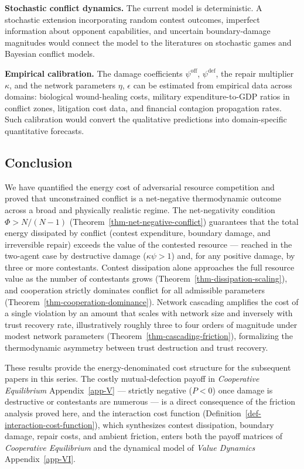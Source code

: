 \documentclass[11pt]{article}
\theoremstyle{plain}
\theoremstyle{definition}
\theoremstyle{remark}
\let\origsubsection\subsection
\renewcommand{\subsection}{\needspace{7\baselineskip}\origsubsection}
\begin{document}
\textbf{Stochastic conflict dynamics.} The current model is
deterministic. A stochastic extension incorporating random contest
outcomes, imperfect information about opponent capabilities, and
uncertain boundary-damage magnitudes would connect the model to the
literatures on stochastic games and Bayesian conflict models.

\textbf{Empirical calibration.} The damage coefficients
\(\psi^{\text{off}}\), \(\psi^{\text{def}}\), the repair multiplier
\(\kappa\), and the network parameters \(\eta\), \(\epsilon\) can be
estimated from empirical data across domains: biological wound-healing
costs, military expenditure-to-GDP ratios in conflict zones, litigation
cost data, and financial contagion propagation rates. Such calibration
would convert the qualitative predictions into domain-specific
quantitative forecasts.

\subsection{Conclusion}\label{conclusion-3}

We have quantified the energy cost of adversarial resource competition
and proved that unconstrained conflict is a net-negative thermodynamic
outcome across a broad and physically realistic regime. The
net-negativity condition \(\Phi > N/(N-1)\)
(Theorem~\ref{thm-net-negative-conflict}) guarantees that the total
energy dissipated by conflict (contest expenditure, boundary damage, and
irreversible repair) exceeds the value of the contested resource ---
reached in the two-agent case by destructive damage (\(\kappa\psi > 1\))
and, for any positive damage, by three or more contestants. Contest
dissipation alone approaches the full resource value as the number of
contestants grows (Theorem~\ref{thm-dissipation-scaling}), and
cooperation strictly dominates conflict for all admissible parameters
(Theorem~\ref{thm-cooperation-dominance}). Network cascading amplifies
the cost of a single violation by an amount that scales with network
size and inversely with trust recovery rate, illustratively roughly
three to four orders of magnitude under modest network parameters
(Theorem~\ref{thm-cascading-friction}), formalizing the thermodynamic
asymmetry between trust destruction and trust recovery.

These results provide the energy-denominated cost structure for the
subsequent papers in this series. The costly mutual-defection payoff in
\emph{Cooperative Equilibrium} Appendix~\ref{app-V} --- strictly
negative (\(P < 0\)) once damage is destructive or contestants are
numerous --- is a direct consequence of the friction analysis proved
here, and the interaction cost function
(Definition~\ref{def-interaction-cost-function}), which synthesizes
contest dissipation, boundary damage, repair costs, and ambient
friction, enters both the payoff matrices of \emph{Cooperative
Equilibrium} and the dynamical model of \emph{Value Dynamics}
Appendix~\ref{app-VI}.
\end{document}
